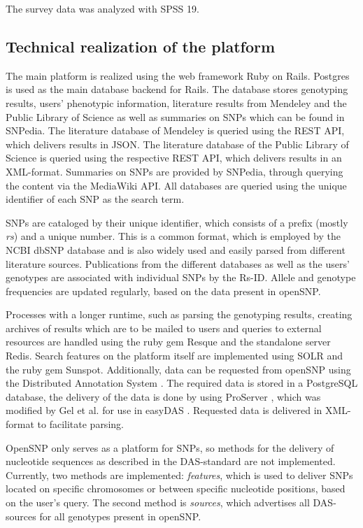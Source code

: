 \documentclass[10pt]{article}
\begin{document}
The survey data was analyzed with SPSS 19. 

\subsection*{Technical realization of the platform}
The main platform is realized using the web framework Ruby on Rails. Postgres is used as the main database backend for Rails. The database stores genotyping results, users' phenotypic information, literature results from Mendeley and the Public Library of Science as well as summaries on SNPs which can be found in SNPedia. The literature database of Mendeley is queried using the REST API, which delivers results in JSON. The literature database of the Public Library of Science is queried using the respective REST API, which delivers results in an XML-format. Summaries on SNPs are provided by SNPedia, through querying the content via the MediaWiki API. All databases are queried using the unique identifier of each SNP as the search term. 

SNPs are cataloged by their unique identifier, which consists of a prefix (mostly \textit{rs}) and a unique number. This is a common format, which is employed by the NCBI dbSNP database and is also widely used and easily parsed from different literature sources. Publications from the different databases as well as the users' genotypes are associated with individual SNPs by the Rs-ID. Allele and genotype frequencies are updated regularly, based on the data present in openSNP. 

Processes with a longer runtime, such as parsing the genotyping results, creating archives of results which are to be mailed to users and queries to external resources are handled using the ruby gem Resque and the standalone server Redis. Search features on the platform itself are implemented using SOLR and the ruby gem Sunspot. Additionally, data can be requested from openSNP using the Distributed Annotation System \cite{Dowell2001,Jenkinson2008}. The required data is stored in a PostgreSQL database, the delivery of the data is done by using ProServer \cite{Finn2007}, which was modified by Gel et al. for use in easyDAS \cite{GelMoreno2011}. Requested data is delivered in XML-format to facilitate parsing. %

OpenSNP only serves as a platform for SNPs, so methods for the delivery of nucleotide sequences as described in the DAS-standard are not implemented. Currently, two methods are implemented: \textit{features}, which is used to deliver SNPs located on specific chromosomes or between specific nucleotide positions, based on the user's query. The second method is \textit{sources}, which advertises all DAS-sources for all genotypes present in openSNP.
\end{document}
